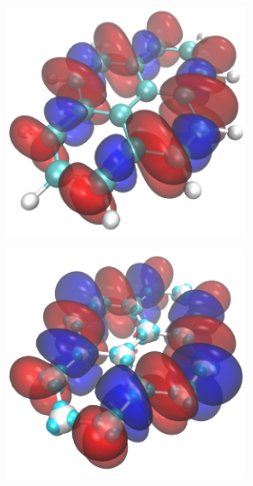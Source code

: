 \documentclass[12pt]{article}
\begin{document}
\begin{figure}
\begin{center}
\includegraphics[width=7cm, height=7cm]{pyrene_peak1_ref_white}
\includegraphics[width=7cm, height=7cm]{pyrene_peak1_ps_white}


\end{center}
\end{figure}
\end{document}

